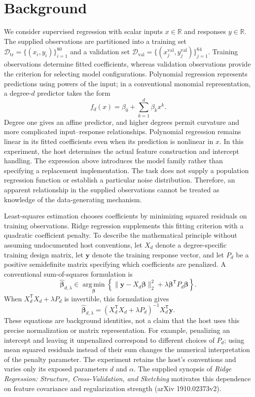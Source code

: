 \documentclass[11pt]{article}
\begin{document}
\section{Background}
We consider supervised regression with scalar inputs \(x\in\mathbb{R}\) and responses \(y\in\mathbb{R}\). The supplied observations are partitioned into a training set \(\mathcal{D}_{\mathrm{tr}}=\{(x_i,y_i)\}_{i=1}^{80}\) and a validation set \(\mathcal{D}_{\mathrm{val}}=\{(x_j^{\mathrm{val}},y_j^{\mathrm{val}})\}_{j=1}^{64}\). Training observations determine fitted coefficients, whereas validation observations provide the criterion for selecting model configurations. Polynomial regression represents predictions using powers of the input; in a conventional monomial representation, a degree-\(d\) predictor takes the form
\[
f_d(x)=\beta_0+\sum_{k=1}^{d}\beta_k x^k.
\]
Degree one gives an affine predictor, and higher degrees permit curvature and more complicated input--response relationships. Polynomial regression remains linear in its fitted coefficients even when its prediction is nonlinear in \(x\). In this experiment, the host determines the actual feature construction and intercept handling. The expression above introduces the model family rather than specifying a replacement implementation. The task does not supply a population regression function or establish a particular noise distribution. Therefore, an apparent relationship in the supplied observations cannot be treated as knowledge of the data-generating mechanism.

Least-squares estimation chooses coefficients by minimizing squared residuals on training observations. Ridge regression supplements this fitting criterion with a quadratic coefficient penalty. To describe the mathematical principle without assuming undocumented host conventions, let \(X_d\) denote a degree-specific training design matrix, let \(\mathbf{y}\) denote the training response vector, and let \(P_d\) be a positive semidefinite matrix specifying which coefficients are penalized. A conventional sum-of-squares formulation is
\[
\widehat{\boldsymbol{\beta}}_{d,\lambda}
\in\operatorname*{arg\,min}_{\boldsymbol{\beta}}
\left\{
\|\mathbf{y}-X_d\boldsymbol{\beta}\|_2^2
+\lambda\boldsymbol{\beta}^{\mathsf T}P_d\boldsymbol{\beta}
\right\}.
\]
When \(X_d^{\mathsf T}X_d+\lambda P_d\) is invertible, this formulation gives
\[
\widehat{\boldsymbol{\beta}}_{d,\lambda}
=
\left(X_d^{\mathsf T}X_d+\lambda P_d\right)^{-1}
X_d^{\mathsf T}\mathbf{y}.
\]
These equations are background identities, not a claim that the host uses this precise normalization or matrix representation. For example, penalizing an intercept and leaving it unpenalized correspond to different choices of \(P_d\); using mean squared residuals instead of their sum changes the numerical interpretation of the penalty parameter. The experiment retains the host's conventions and varies only its exposed parameters \(d\) and \(\alpha\). The supplied synopsis of \emph{Ridge Regression: Structure, Cross-Validation, and Sketching} motivates this dependence on feature covariance and regularization strength (arXiv 1910.02373v2).
\end{document}
